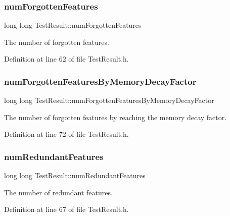\subsubsection{\texorpdfstring{num\+Forgotten\+Features}{numForgottenFeatures}}
{\footnotesize\ttfamily long long Test\+Result\+::num\+Forgotten\+Features\hspace{0.3cm}{\ttfamily [protected]}}

The number of forgotten features. 

Definition at line 62 of file Test\+Result.\+h.

\mbox{\label{class_test_result_a1e421539c0074eeb06cc31ba177a724e}} 
\subsubsection{\texorpdfstring{num\+Forgotten\+Features\+By\+Memory\+Decay\+Factor}{numForgottenFeaturesByMemoryDecayFactor}}
{\footnotesize\ttfamily long long Test\+Result\+::num\+Forgotten\+Features\+By\+Memory\+Decay\+Factor\hspace{0.3cm}{\ttfamily [protected]}}

The number of forgotten features by reaching the memory decay factor. 

Definition at line 72 of file Test\+Result.\+h.

\mbox{\label{class_test_result_aa416470604df77c02a8f4a971f413e1a}} 
\subsubsection{\texorpdfstring{num\+Redundant\+Features}{numRedundantFeatures}}
{\footnotesize\ttfamily long long Test\+Result\+::num\+Redundant\+Features\hspace{0.3cm}{\ttfamily [protected]}}

The number of redundant features. 

Definition at line 67 of file Test\+Result.\+h.

